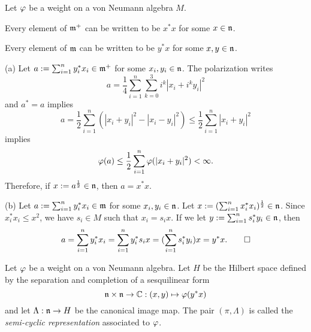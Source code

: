 \documentclass{../../small}
\begin{document}
\begin{prop}
Let $\varphi$ be a weight on a von Neumann algebra $M$.
\begin{parts}
\item Every element of $\mathfrak{m}^+$ can be written to be $x^*x$ for some $x\in\mathfrak{n}$.
\item Every element of $\mathfrak{m}$ can be written to be $y^*x$ for some $x,y\in\mathfrak{n}$.
\end{parts}
\end{prop}
\begin{pf}
(a)
Let $a:=\sum_{i=1}^ny_i^*x_i\in\mathfrak{m}^+$ for some $x_i,y_i\in\mathfrak{n}$.
The polarization writes
\[a=\frac14\sum_{i=1}^n\sum_{k=0}^3i^k|x_i+i^ky_i|^2\]
and $a^*=a$ implies
\[a=\frac12\sum_{i=1}^n(|x_i+y_i|^2-|x_i-y_i|^2)\le\frac12\sum_{i=1}^n|x_i+y_i|^2\]
implies
\[\varphi(a)\le\frac12\sum_{i=1}^n\varphi(|x_i+y_i|^2)<\infty.\]
Therefore, if $x:=a^{\frac12}\in\mathfrak{n}$, then $a=x^*x$.

(b)
Let $a:=\sum_{i=1}^ny_i^*x_i\in\mathfrak{m}$ for some $x_i,y_i\in\mathfrak{n}$.
Let $x:=(\sum_{i=1}^nx_i^*x_i)^{\frac12}\in\mathfrak{n}$.
Since $x_i^*x_i\le x^2$, we have $s_i\in M$ such that $x_i=s_ix$.
If we let $y:=\sum_{i=1}^ns_i^*y_i\in\mathfrak{n}$, then
\[a=\sum_{i=1}^ny_i^*x_i=\sum_{i=1}^ny_i^*s_ix=(\sum_{i=1}^ns_i^*y_i)x=y^*x.\qedhere\]
\end{pf}


\begin{defn}
Let $\varphi$ be a weight on a von Neumann algebra.
Let $H$ be the Hilbert space defined by the separation and completion of a sesquilinear form
\[\mathfrak{n}\times\mathfrak{n}\to\mathbb{C}:(x,y)\mapsto\varphi(y^*x)\]
and let $\Lambda:\mathfrak{n}\to H$ be the canonical image map.
The pair $(\pi,\Lambda)$ is called the \emph{semi-cyclic representation} associated to $\varphi$.
\end{defn}
\end{document}
